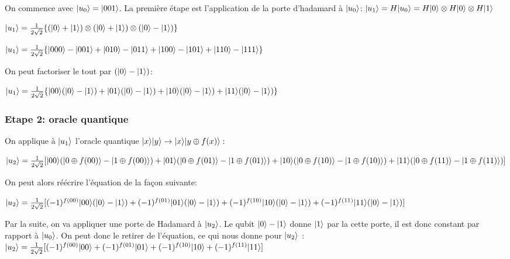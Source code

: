 \documentclass[12pt,a4paper]{article}
\DeclarePairedDelimiter\ket{\lvert}{\rangle}
\begin{document}
On commence avec $\ket{u_0} = \ket{001}$. La première étape est l'application de la porte d'hadamard à $\ket{u_0}$: 
\medbreak
$
\ket{u_1} = H\ket{u_0} = H\ket{0} \otimes H\ket{0} \otimes H\ket{1}
$

$
\ket{u_1} = \frac{1}{2\sqrt{2}}\{ (\ket{0} + \ket{1})\otimes(\ket{0} + \ket{1})\otimes(\ket{0} - \ket{1}) \}
$

$
\ket{u_1} = \frac{1}{2\sqrt{2}}\{\ket{000} - \ket{001} + \ket{010} - \ket{011} + \ket{100} - \ket{101} + \ket{110} - \ket{111}\}
$

On peut factoriser le tout par $(\ket{0} - \ket{1})$: 

$
\ket{u_1} = \frac{1}{2\sqrt{2}}\{\ket{00}(\ket{0} - \ket{1}) + \ket{01}(\ket{0} - \ket{1}) + \ket{10}(\ket{0} - \ket{1}) + \ket{11}(\ket{0} - \ket{1})\}
$

\subsubsection{Etape 2: oracle quantique}

On applique à $\ket{u_1}$ l'oracle quantique $\ket{x}\ket{y}\rightarrow\ket{x}\ket{y\oplus f(x)}:$

$
\ket{u_2} = \frac{1}{2\sqrt{2}}[ \\ 
\ket{00}(\ket{0 \oplus f(00)} - \ket{1 \oplus f(00)}) + \\
\ket{01}(\ket{0 \oplus f(01)} - \ket{1 \oplus f(01)}) + \\
\ket{10}(\ket{0 \oplus f(10)} - \ket{1 \oplus f(10)}) + \\
\ket{11}(\ket{0 \oplus f(11)} - \ket{1 \oplus f(11)})]
$

\medbreak
On peut alors réécrire l'équation de la façon suivante: 

$
\ket{u_2} = \frac{1}{2\sqrt{2}}[ \\
(-1)^{f(00)} \ket{00}  (\ket{0} - \ket{1}) + \\
(-1)^{f(01)} \ket{01}  (\ket{0} - \ket{1}) + \\
(-1)^{f(10)} \ket{10}  (\ket{0} - \ket{1}) + \\
(-1)^{f(11)} \ket{11}  (\ket{0} - \ket{1}) ]
$

Par la suite, on va appliquer une porte de Hadamard à $\ket{u_2}$. Le qubit $\ket{0} - \ket{1}$ donne $\ket{1}$ par la cette porte, il est donc constant par rapport à $\ket{u_0}$. On peut donc le retirer de l'équation, ce qui nous donne pour $\ket{u_2}$ :
\medbreak
$
\ket{u_2} = \frac{1}{2\sqrt{2}}[(-1)^{f(00)} \ket{00} + (-1)^{f(01)} \ket{01} + (-1)^{f(10)} \ket{10} + (-1)^{f(11)} \ket{11} ]
$
\end{document}
